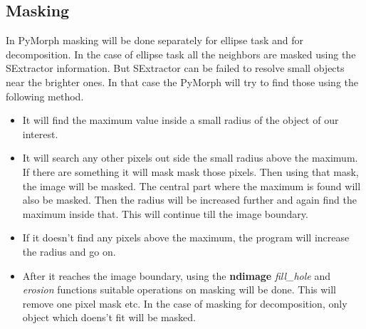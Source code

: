 \documentclass[a4paper,12pt]{article}
\begin{document}
\subsection{Masking}
In PyMorph masking will be done separately for ellipse task and for decomposition. In the case of ellipse task all the neighbors are masked using the SExtractor information. But SExtractor can be failed to resolve small objects near the brighter ones. In that case the PyMorph will try to find those using the following method.
\begin{itemize}
\item It will find the maximum value inside a small radius of the object
 of our interest.
\item It will search any other pixels out side the small radius above the
 maximum. If there are something it will mask mask those pixels. Then
 using that mask, the image will be masked. The central part where the
 maximum is found will also be masked. Then the radius will be increased
 further and again find the maximum inside that. This will continue till
 the image boundary.
\item If it doesn't find any pixels above the maximum, the program will
 increase the radius and go on.
\item After it reaches the image boundary, using the\textbf{ ndimage}\textit{
 fill\_hole} and\textit{ erosion} functions suitable operations on
 masking will be done. This will remove one pixel mask etc. In the case
 of masking for decomposition, only object which doens't fit will be
 masked.
\end{itemize}
\end{document}
